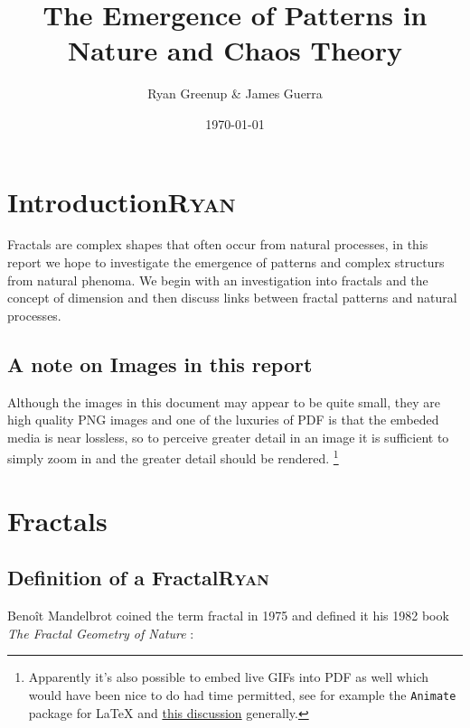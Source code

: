 \documentclass[a4paper,11pt,twoside]{article}
\author{Ryan Greenup \& James Guerra}
\date{\today}
\title{The Emergence of Patterns in Nature and Chaos Theory}
\begin{document}
\maketitle
\tableofcontents

 \newpage 
\section{Introduction\hfill{}\textsc{Ryan}}
\label{sec:org5d9a1cf}
Fractals are complex shapes that often occur from natural processes, in this
report we hope to investigate the emergence of patterns and complex structurs
from natural phenoma. We begin with an investigation into fractals and the
concept of dimension and then discuss links between fractal patterns and natural
processes.

\subsection{A note on Images in this report}
\label{sec:org4fb7e99}
Although the images in this document may appear to be quite small, they are high quality PNG images and one of the luxuries of PDF is that the embeded media is near lossless, so to perceive greater detail in an image it is sufficient to simply zoom in and the greater detail should be rendered. \footnote{Apparently it's also possible to embed live GIFs into PDF as well which would have been nice to do had time permitted, see for example the \texttt{Animate} package for \LaTeX \cite{CTANPackageAnimate} and \href{https://tex.stackexchange.com/questions/5396/is-there-any-way-to-include-an-animated-gif-directly}{this discussion} \cite{PdftexThereAny} generally.}

\section{Fractals}
\label{sec:org464fa26}
\subsection{Definition of a Fractal\hfill{}\textsc{Ryan}}
\label{sec:orgab52494}

Benoît Mandelbrot coined the term fractal in 1975 \cite{gomoryBenoitMandelbrot19242010} and defined it his 1982 book \emph{The Fractal Geometry of Nature} \cite[p. 15]{mandelbrotFractalGeometryNature1982} :
\end{document}
